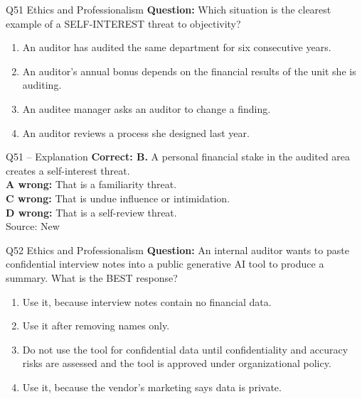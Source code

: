 \documentclass[aspectratio=169,10pt]{beamer}
\begin{document}
\begin{frame}[t]{Q51 \hfill {\scriptsize Ethics and Professionalism}}
	\small
	\textbf{Question:} Which situation is the clearest example of a SELF-INTEREST threat to objectivity?
	\begin{enumerate}[label=\Alph*.,itemsep=1pt,topsep=3pt]
			\item An auditor has audited the same department for six consecutive years.
			\item An auditor's annual bonus depends on the financial results of the unit she is auditing.
			\item An auditee manager asks an auditor to change a finding.
			\item An auditor reviews a process she designed last year.
	\end{enumerate}
\end{frame}

\begin{frame}[t]{Q51 -- Explanation}
	\footnotesize
	\textbf{Correct: B.} A personal financial stake in the audited area creates a self-interest threat. \\[5pt]
\textbf{A wrong:} That is a familiarity threat. \\[3pt]
\textbf{C wrong:} That is undue influence or intimidation. \\[3pt]
\textbf{D wrong:} That is a self-review threat. \\[3pt]
	\vfill {\tiny Source: New}
\end{frame}

\begin{frame}[t]{Q52 \hfill {\scriptsize Ethics and Professionalism}}
	\small
	\textbf{Question:} An internal auditor wants to paste confidential interview notes into a public generative AI tool to produce a summary. What is the BEST response?
	\begin{enumerate}[label=\Alph*.,itemsep=1pt,topsep=3pt]
			\item Use it, because interview notes contain no financial data.
			\item Use it after removing names only.
			\item Do not use the tool for confidential data until confidentiality and accuracy risks are assessed and the tool is approved under organizational policy.
			\item Use it, because the vendor's marketing says data is private.
	\end{enumerate}
\end{frame}
\end{document}
